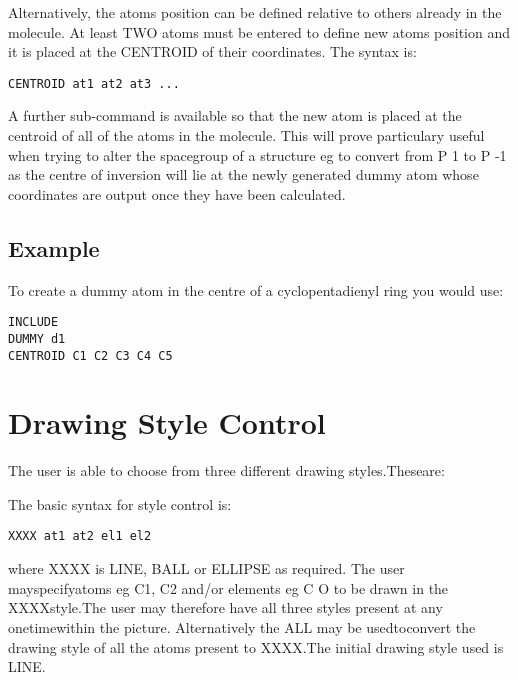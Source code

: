 \documentclass[10pt,a4paper]{report}
\begin{document}
\bigskip{}
Alternatively, the atoms position can be defined relative to
others
already in the molecule. At least TWO atoms must be entered to
define
new atoms position and it is placed at the CENTROID of their
coordinates. The syntax is:
\small\begin{verbatim}
CENTROID at1 at2 at3 ...
\end{verbatim}\normalsize




\bigskip{}
A further sub-command is available so that the new atom is placed
at the
centroid of all of the atoms in the molecule. This will prove
particulary useful when trying to alter the spacegroup of a
structure eg
to convert from P 1 to P -1 as the centre of inversion will lie
at the
newly generated dummy atom whose coordinates are output once they
have
been calculated.



\section{Example}


To create a dummy atom in the centre of a cyclopentadienyl ring you
would use:
\small\begin{verbatim}
INCLUDE
DUMMY d1
CENTROID C1 C2 C3 C4 C5
\end{verbatim}\normalsize


\chapter{Drawing Style Control}

The user is able to choose from three different drawing styles.Theseare:

\bigskip{}



\bigskip{}



\bigskip{}





The basic syntax for style control is:\small\begin{verbatim}XXXX at1 at2 el1 el2\end{verbatim}\normalsize

where XXXX is LINE, BALL or ELLIPSE as required. The user mayspecifyatoms eg C1, C2 and/or elements eg C O to be drawn in the XXXXstyle.The user may therefore have all three styles present at any onetimewithin the picture. Alternatively the ALL may be usedtoconvert the drawing style of all the atoms present to XXXX.The initial drawing style used is LINE.
\end{document}
